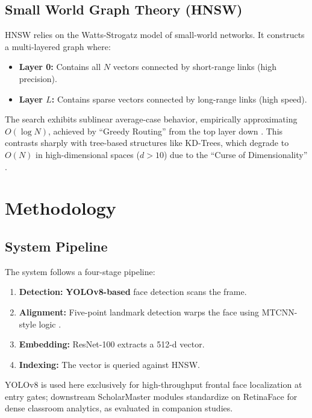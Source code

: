 \documentclass[conference]{IEEEtran}
\begin{document}
\subsection{Small World Graph Theory (HNSW)}



HNSW relies on the Watts-Strogatz model of small-world networks. It constructs a multi-layered graph where:
\begin{itemize}
    \item \textbf{Layer 0:} Contains all $N$ vectors connected by short-range links (high precision).
    \item \textbf{Layer $L$:} Contains sparse vectors connected by long-range links (high speed).
\end{itemize}

The search exhibits sublinear average-case behavior, empirically approximating $O(\log N)$, achieved by ``Greedy Routing'' from the top layer down \cite{b7}. This contrasts sharply with tree-based structures like KD-Trees, which degrade to $O(N)$ in high-dimensional spaces ($d > 10$) due to the ``Curse of Dimensionality'' \cite{b12}.

\section{Methodology}

\subsection{System Pipeline}

The system follows a four-stage pipeline:
\begin{enumerate}
    \item \textbf{Detection:} \textbf{YOLOv8-based} face detection scans the frame.
    \item \textbf{Alignment:} Five-point landmark detection warps the face using MTCNN-style logic \cite{b13}.
    \item \textbf{Embedding:} ResNet-100 extracts a 512-d vector.
    \item \textbf{Indexing:} The vector is queried against HNSW.
\end{enumerate}
YOLOv8 is used here exclusively for high-throughput frontal face localization at entry gates; downstream ScholarMaster modules standardize on RetinaFace for dense classroom analytics, as evaluated in companion studies.
\end{document}
